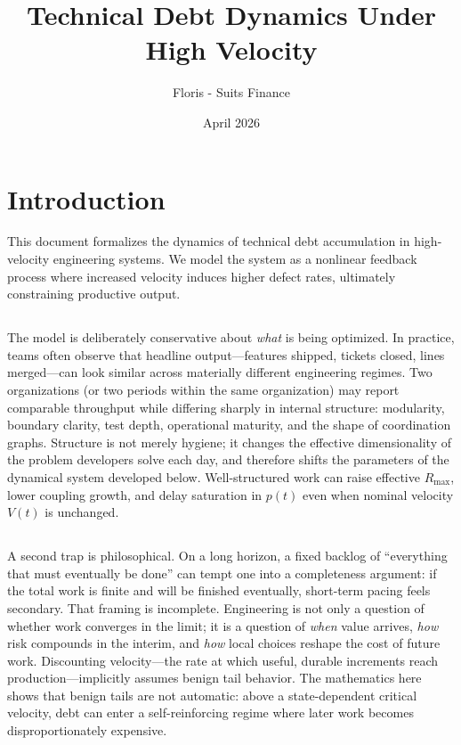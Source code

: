 \documentclass[11pt]{article}
\title{Technical Debt Dynamics Under High Velocity}
\author{Floris - Suits Finance }
\date{April 2026}
\begin{document}
\maketitle

\section{Introduction}

This document formalizes the dynamics of technical debt accumulation in high-velocity engineering systems. We model the system as a nonlinear feedback process where increased velocity induces higher defect rates, ultimately constraining productive output.

\subsection{}

The model is deliberately conservative about \emph{what} is being optimized. In practice, teams often observe that headline output---features shipped, tickets closed, lines merged---can look similar across materially different engineering regimes. Two organizations (or two periods within the same organization) may report comparable throughput while differing sharply in internal structure: modularity, boundary clarity, test depth, operational maturity, and the shape of coordination graphs. Structure is not merely hygiene; it changes the effective dimensionality of the problem developers solve each day, and therefore shifts the parameters of the dynamical system developed below. Well-structured work can raise effective $R_{\max}$, lower coupling growth, and delay saturation in $p(t)$ even when nominal velocity $V(t)$ is unchanged.


\subsection{}
A second trap is philosophical. On a long horizon, a fixed backlog of ``everything that must eventually be done'' can tempt one into a completeness argument: if the total work is finite and will be finished eventually, short-term pacing feels secondary. That framing is incomplete. Engineering is not only a question of whether work converges in the limit; it is a question of \emph{when} value arrives, \emph{how} risk compounds in the interim, and \emph{how} local choices reshape the cost of future work. Discounting velocity---the rate at which useful, durable increments reach production---implicitly assumes benign tail behavior. The mathematics here shows that benign tails are not automatic: above a state-dependent critical velocity, debt can enter a self-reinforcing regime where later work becomes disproportionately expensive.
\end{document}
